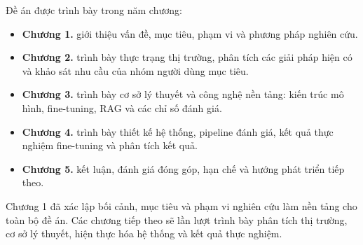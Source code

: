 Đề án được trình bày trong năm chương:

\begin{itemize}
\item
  \textbf{Chương 1.} giới thiệu vấn đề, mục tiêu, phạm vi và phương pháp
  nghiên cứu.
\item
  \textbf{Chương 2.} trình bày thực trạng thị trường, phân tích các giải
  pháp hiện có và khảo sát nhu cầu của nhóm người dùng mục tiêu.
\item
  \textbf{Chương 3.} trình bày cơ sở lý thuyết và công nghệ nền tảng: kiến
  trúc mô hình, fine-tuning, RAG và các chỉ số đánh giá.
\item
  \textbf{Chương 4.} trình bày thiết kế hệ thống, pipeline đánh giá, kết
  quả thực nghiệm fine-tuning và phân tích kết quả.
\item
  \textbf{Chương 5.} kết luận, đánh giá đóng góp, hạn chế và hướng phát
  triển tiếp theo.
\end{itemize}

Chương 1 đã xác lập bối cảnh, mục tiêu và phạm vi nghiên cứu làm nền
tảng cho toàn bộ đề án. Các chương tiếp theo sẽ lần lượt trình bày
phân tích thị trường, cơ sở lý thuyết, hiện thực hóa hệ thống và kết
quả thực nghiệm.
